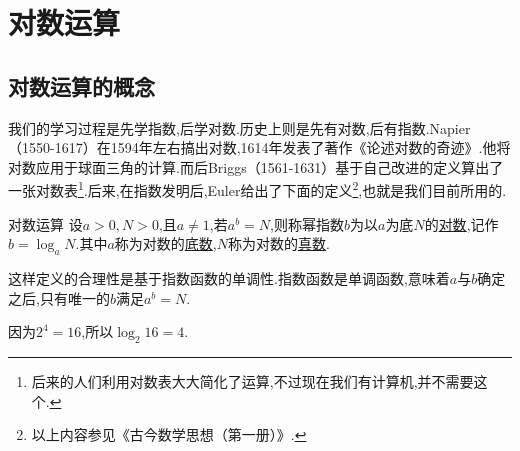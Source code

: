 \documentclass[lang=cn,math=cm,chinesefont=nofont,11pt,scheme=chinese,twocol]{elegantbook}
\begin{document}
\section{对数运算}

\subsection{对数运算的概念}

我们的学习过程是先学指数,后学对数.历史上则是先有对数,后有指数.Napier（1550-1617）在1594年左右搞出对数,1614年发表了著作《论述对数的奇迹》.他将对数应用于球面三角的计算.而后Briggs（1561-1631）基于自己改进的定义算出了一张对数表\footnote{后来的人们利用对数表大大简化了运算,不过现在我们有计算机,并不需要这个.}.后来,在指数发明后,Euler给出了下面的定义\footnote{以上内容参见《古今数学思想（第一册）》.},也就是我们目前所用的.

\begin{definition}{对数运算}
  设$a>0,N>0$,且$a\neq 1$,若$a^b=N$,则称幂指数$b$为以$a$为底$N$的\underline{对数},记作$b=\log_aN$.其中$a$称为对数的\underline{底数},$N$称为对数的\underline{真数}.
\end{definition}

\begin{remark}
  这样定义的合理性是基于指数函数的单调性.指数函数是单调函数,意味着$a$与$b$确定之后,只有唯一的$b$满足$a^b=N$.
\end{remark}

\begin{example}
  因为$2^4=16$,所以$\log_2 16=4$.
\end{example}
\end{document}
